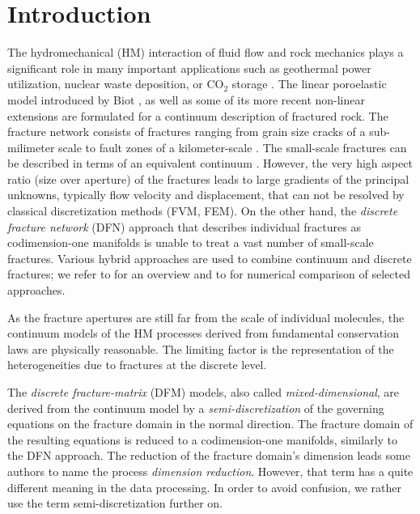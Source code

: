 \documentclass[a4paper]{article}
\numberwithin{equation}{section}
\begin{document}
\section{Introduction}
The hydromechanical (HM) interaction of fluid flow and rock mechanics plays a significant role in many important applications such as geothermal power utilization, nuclear waste deposition, or CO${}_2$ storage \cite{rutqvist2003role}. The linear poroelastic model introduced by Biot \cite{biot1941general}, as well as some of its more recent non-linear extensions \cite{rutqvist2003role,Jing2007Fluid} are formulated for a continuum description of fractured rock. The fracture network consists of fractures ranging from grain size cracks of a sub-milimeter scale to fault zones of a kilometer-scale \cite{Bonnet2001}. The small-scale fractures can be described in terms of an equivalent continuum \cite{Oda1986,Rutqvist2013a}. However, the very high aspect ratio (size over aperture) of the fractures leads to large gradients of the principal unknowns, typically flow velocity and displacement, that can not be resolved by classical discretization methods (FVM, FEM). On the other hand, the \textit{discrete fracture network} (DFN) approach \cite{Follin2014methodology,Hyman2015dfnWorks} that describes individual fractures as codimension-one manifolds is unable to treat a vast number of small-scale fractures. Various hybrid approaches are used to combine continuum and discrete fractures; we refer to \cite{Jing2002} for an overview and to \cite{Zhao2013Impact} for numerical comparison of selected approaches. 

As the fracture apertures are still far from the scale of individual molecules, the continuum models of the HM processes derived from fundamental conservation laws are physically reasonable. The limiting factor is the representation of the heterogeneities due to fractures  at the discrete level.

The \textit{discrete fracture-matrix} (DFM) models, also called \textit{mixed-dimensional}, are derived from the continuum model by a \emph{semi-discretization} of the governing equations on the fracture domain
in the normal direction. The fracture domain of the resulting equations is reduced to a codimension-one manifolds, similarly to the DFN approach. The reduction of the fracture domain's dimension leads some authors to name the process \emph{dimension reduction}. However, that term has a quite different meaning in the data processing. In order to avoid confusion, we rather use the term semi-discretization further on.
\end{document}
